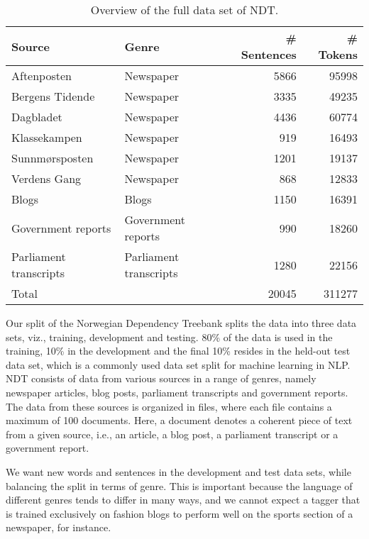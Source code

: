\documentclass[a4paper,12pt,english]{book}
\begin{document}
\begin{table}
    \vspace{1ex}
    \centering
    \smaller[0.5]
    \begin{tabular}{@{}llrr@{}}
        \toprule
        \textbf{Source} & \textbf{Genre} & \textbf{\# Sentences} &
        \textbf{\# Tokens} \\
        \midrule
        Aftenposten & Newspaper & 5866 & 95998 \\
        Bergens Tidende & Newspaper & 3335 & 49235 \\
        Dagbladet & Newspaper & 4436 & 60774 \\
        Klassekampen & Newspaper & 919 & 16493 \\
        Sunnmørsposten & Newspaper & 1201 & 19137 \\
        Verdens Gang & Newspaper & 868 & 12833 \\
        Blogs & Blogs & 1150 & 16391 \\
        Government reports & Government reports & 990 & 18260 \\
        Parliament transcripts & Parliament transcripts & 1280 & 22156 \\
        \midrule
        Total & & 20045 & 311277 \\
        \bottomrule
    \end{tabular}
    \caption{Overview of the full data set of NDT.}
    \label{completedataset}
\end{table}

Our split of the Norwegian Dependency Treebank splits the data into three data
sets, viz., training, development and testing. 80\% of the data is used in the
training, 10\% in the development and the final 10\% resides in the held-out
test data set, which is a commonly used data set split for machine learning in
NLP. NDT consists of data from various sources in a range of genres, namely
newspaper articles, blog posts, parliament transcripts and government reports.
The data from these sources is organized in files, where each file contains a
maximum of 100 documents. Here, a document denotes a coherent piece of text
from a given source, i.e., an article, a blog post, a parliament transcript or
a government report.

We want new words and sentences in the development and test data sets, while
balancing the split in terms of genre. This is important because the language
of different genres tends to differ in many ways, and we cannot expect a tagger
that is trained exclusively on fashion blogs to perform well on the sports
section of a newspaper, for instance.
\end{document}
